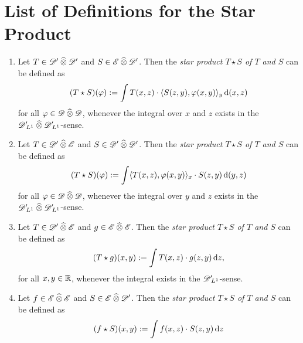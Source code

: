 \section{List of Definitions for the Star Product}


\begin{definition}
    \begin{enumerate}
        \item 
        Let $ T \in \mathscr{  D  }' \mathbin{\widehat{\otimes}} \mathscr{  D  }' $ and $ S \in \mathscr{  E  } \mathbin{\widehat{\otimes}} \mathscr{  D  }' $.
        Then the {\em star product $ T \star S $ of $ T $ and $ S $}
        can be defined as
        \begin{align}
            ( T \star S )( \varphi )
            :=
            \int T(x,z) \cdot \langle  S(z,y)  ,  \varphi(x,y)  \rangle_y \,\mathrm{ d }{ ( }x,z)
        \end{align}
        for all $ \varphi \in \mathscr{  D  } \mathbin{\widehat{\otimes}} \mathscr{  D  } $,
        whenever the integral over $ x $ and $ z $
        exists in the $\mathscr{  D  }'\hspace{-2pt}{}_{ L^{ 1 } }\mathbin{\widehat{\otimes}}\mathscr{  D  }'\hspace{-2pt}{}_{ L^{ 1 } }$-sense.
        \item
        Let $ T \in \mathscr{  D  }' \mathbin{\widehat{\otimes}} \mathscr{  E  } $ and $ S \in \mathscr{  D  }' \mathbin{\widehat{\otimes}} \mathscr{  D  }' $.
        Then the {\em star product $ T \star S $ of $ T $ and $ S $}
        can be defined as
        \begin{align}
            ( T \star S )( \varphi )
            :=
            \int \langle  T(x,z)  ,  \varphi(x,y)  \rangle_x \cdot S(z,y) \,\mathrm{ d }{ ( }y,z)
        \end{align}
        for all $ \varphi \in \mathscr{  D  } \mathbin{\widehat{\otimes}} \mathscr{  D  } $,
        whenever the integral over $ y $ and $ z $
        exists in the $\mathscr{  D  }'\hspace{-2pt}{}_{ L^{ 1 } }\mathbin{\widehat{\otimes}}\mathscr{  D  }'\hspace{-2pt}{}_{ L^{ 1 } }$-sense.
        \item
        Let $ T \in \mathscr{  D  }' \mathbin{\widehat{\otimes}} \mathscr{  E  } $ and $ g \in \mathscr{  E  } \mathbin{\widehat{\otimes}} \mathscr{  E  } $.
        Then the {\em star product $ T \star S $ of $ T $ and $ S $}
        can be defined as
        \begin{align}
            ( T \star g )( x, y )
            :=
            \int T( x, z ) \cdot g( z, y ) \,\mathrm{ d }{ z }
            ,
            \label{def:sp:Tg}
        \end{align}
        for all $ x,y \in \mathbb{ R } $,
        whenever the integral exists in the $\mathscr{  D  }'\hspace{-2pt}{}_{ L^{ 1 } }$-sense.
        \item
        Let $ f \in \mathscr{  E  } \mathbin{\widehat{\otimes}} \mathscr{  E  } $ and $ S \in \mathscr{  E  } \mathbin{\widehat{\otimes}} \mathscr{  D  }' $.
        Then the {\em star product $ T \star S $ of $ T $ and $ S $}
        can be defined as
        \begin{align}
            ( f \star S )( x, y )
            :=
            \int f( x, z ) \mult S( z, y ) \intd{z}

\end{align}
\end{enumerate}
\end{definition}
